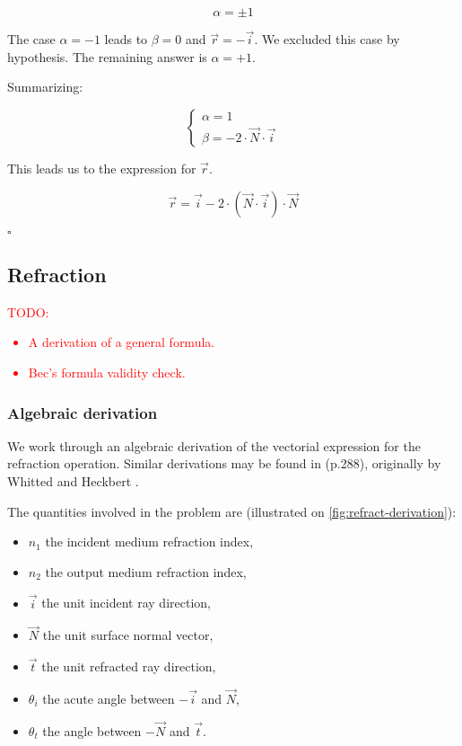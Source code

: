\begin{equation}
\alpha = \pm 1
\end{equation}

The case $\alpha = -1$ leads to $\beta = 0$ and $\overrightarrow{r} = -
\overrightarrow{i}$. We excluded this case by hypothesis.  The remaining answer
is $\alpha = + 1$.

Summarizing:

\begin{equation} \begin{cases}
\alpha = 1 \\
\beta = -2 \cdot \overrightarrow{N} \cdot \overrightarrow{i}
\end{cases} \end{equation}

This leads us to the expression for $\overrightarrow{r}$.

\begin{equation}
\overrightarrow{r} = \overrightarrow{i} - 2 \cdot (\overrightarrow{N} \cdot
\overrightarrow{i}) \cdot \overrightarrow{N}
\end{equation}

$\square$

\subsection{Refraction}
\textcolor{red}{TODO:
\begin{itemize}
\item A derivation of a general formula.
\item Bec's formula validity check.
\end{itemize}}

\subsubsection{Algebraic derivation}
We work through an algebraic derivation of the vectorial expression for
the refraction operation. Similar derivations may be found in
\cite{Glassner:1989} (p.288), originally by Whitted \cite{Whitted:2005}
and Heckbert \cite{Heckbert:1984}.

The quantities involved in the problem are (illustrated on
\cref{fig:refract-derivation}):

\begin{itemize}
\item $n_1$ the incident medium refraction index,
\item $n_2$ the output medium refraction index,
\item $\overrightarrow{i}$ the unit incident ray direction,
\item $\overrightarrow{N}$ the unit surface normal vector,
\item $\overrightarrow{t}$ the unit refracted ray direction,
\item $\theta_i$ the acute angle between $-\overrightarrow{i}$
and $\overrightarrow{N}$,
\item $\theta_t$ the angle between $-\overrightarrow{N}$ and
$\overrightarrow{t}$.
\end{itemize}

